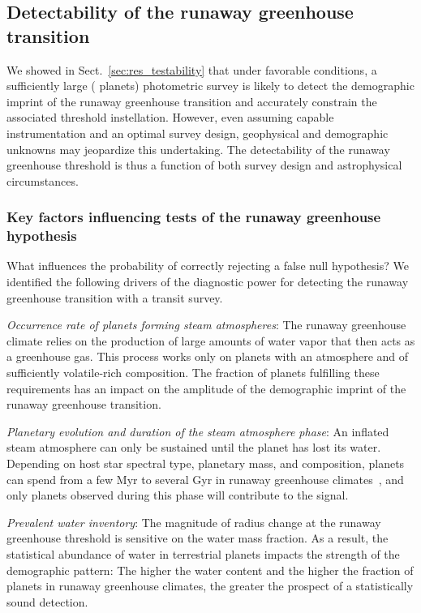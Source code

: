 \documentclass[twocolumn,twocolappendix]{aastex631}
\begin{document}
\subsection{Detectability of the runaway greenhouse transition}
We showed in Sect.~\ref{sec:res_testability} that under favorable conditions, a sufficiently large ( planets) photometric survey is likely to detect the demographic imprint of the runaway greenhouse transition and accurately constrain the associated threshold instellation.
However, even assuming capable instrumentation and an optimal survey design, geophysical and demographic unknowns may jeopardize this undertaking.
The detectability of the runaway greenhouse threshold is thus a function of both survey design and astrophysical circumstances.

\subsubsection{Key factors influencing tests of the runaway greenhouse hypothesis}
What influences the probability of correctly rejecting a false null hypothesis?
We identified the following drivers of the diagnostic power for detecting the runaway greenhouse transition with a transit survey.

\textit{Occurrence rate of planets forming steam atmospheres}: The runaway greenhouse climate relies on the production of large amounts of water vapor that then acts as a greenhouse gas. This process works only on planets with an atmosphere and of sufficiently volatile-rich composition. The fraction of planets fulfilling these requirements has an impact on the amplitude of the demographic imprint of the runaway greenhouse transition.

\textit{Planetary evolution and duration of the steam atmosphere phase}: An inflated steam atmosphere can only be sustained until the planet has lost its water. Depending on host star spectral type, planetary mass, and composition, planets can spend from a few Myr to several Gyr in runaway greenhouse climates~\citep[][]{Hamano2015,Luger2015}, and only planets observed during this phase will contribute to the signal.

\textit{Prevalent water inventory}: The magnitude of radius change at the runaway greenhouse threshold is sensitive on the water mass fraction. As a result, the statistical abundance of water in terrestrial planets impacts the strength of the demographic pattern:
        The higher the water content and the higher the fraction of planets in runaway greenhouse climates, the greater the prospect of a statistically sound detection.
\end{document}
